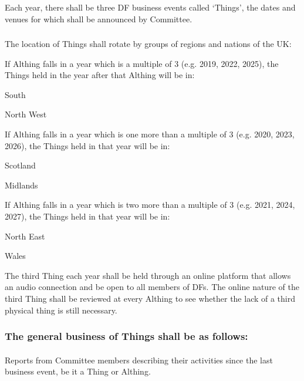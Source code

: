 \documentclass[a4paper, 11pt]{report}
\begin{document}
\subsubsection{}
Each year, there shall be three DF business events called `Things', the dates and venues for which shall be announced by Committee.
\subsubsection{}
The location of Things shall rotate by groups of regions and nations of the UK:

If Althing falls in a year which is a multiple of 3 (e.g. 2019, 2022, 2025), the Things held in the year after that Althing will be in:
\begin{itemize*}
\item South
\item North West
\end{itemize*}

If Althing falls in a year which is one more than a multiple of 3 (e.g. 2020, 2023, 2026), the Things held in that year will be in:
\begin{itemize*}
\item Scotland
\item Midlands
\end{itemize*}

If Althing falls in a year which is two more than a multiple of 3 (e.g. 2021, 2024, 2027), the Things held in that year will be in:
\begin{itemize*}
\item North East
\item Wales
\end{itemize*}

The third Thing each year shall be held through an online platform that allows an audio connection and be open to all members of DFs. The online nature of the third Thing shall be reviewed at every Althing to see whether the lack of a third physical thing is still necessary.

\subsubsection{The general business of Things shall be as follows:}
\paragraph{}
Reports from Committee members describing their activities since the last business event, be it a Thing or Althing.
\end{document}
